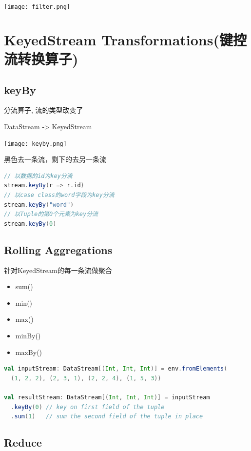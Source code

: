 \documentclass[oneside]{ctexbook}
\begin{document}
\noindent \texttt{[image: filter.png]}

\section{KeyedStream Transformations(键控流转换算子)}

\subsection{keyBy}

分流算子, 流的类型改变了

DataStream -> KeyedStream

\noindent \texttt{[image: keyby.png]}

黑色去一条流，剩下的去另一条流

\begin{lstlisting}[language=scala, breaklines]
// 以数据的id为key分流
stream.keyBy(r => r.id)
// 以case class的word字段为key分流
stream.keyBy("word")
// 以Tuple的第0个元素为key分流
stream.keyBy(0)
\end{lstlisting}

\subsection{Rolling Aggregations}

针对KeyedStream的每一条流做聚合

\begin{itemize}
	\item sum()
	\item min()
	\item max()
	\item minBy()
	\item maxBy()
\end{itemize}

\begin{lstlisting}[language=scala, breaklines]
val inputStream: DataStream[(Int, Int, Int)] = env.fromElements(
  (1, 2, 2), (2, 3, 1), (2, 2, 4), (1, 5, 3))

val resultStream: DataStream[(Int, Int, Int)] = inputStream
  .keyBy(0) // key on first field of the tuple
  .sum(1)   // sum the second field of the tuple in place
\end{lstlisting}

\subsection{Reduce}
\end{document}
